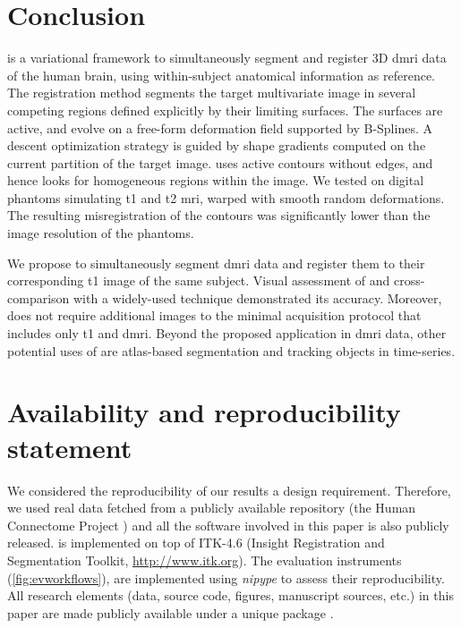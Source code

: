 \section*{Conclusion}
\label{sec:conclusion}

\Regseg{} is a variational framework to simultaneously segment and
  register 3D \gls*{dmri} data of the human brain, using within-subject
  anatomical information as reference.
The registration method segments the target multivariate image in several competing regions
  defined explicitly by their limiting surfaces.
The surfaces are active, and evolve on a free-form deformation field supported by B-Splines.
A descent optimization strategy is guided by shape gradients computed on the current partition
  of the target image.
\Regseg{} uses active contours without edges, and hence looks for
  homogeneous regions within the image.
We tested \regseg{} on digital phantoms simulating \gls*{t1} and \gls*{t2} \gls*{mri},
	warped with smooth random deformations.
The resulting misregistration of the contours was significantly lower than the image resolution
  of the phantoms.

We propose \regseg{} to simultaneously segment \gls*{dmri} data and register them to
  their corresponding \gls*{t1} image of the same subject.
Visual assessment of \regseg{} and cross-comparison with a widely-used technique demonstrated 
  its accuracy.
Moreover, \regseg{} does not require additional images to the minimal acquisition protocol
  that includes only \gls*{t1} and \gls*{dmri}.
Beyond the proposed application in \gls*{dmri} data, other potential uses of \regseg{} are
  atlas-based segmentation and tracking objects in time-series.


\section*{Availability and reproducibility statement}
\label{sec:availability}
We considered the reproducibility of our results a design requirement.
Therefore, we used real data fetched from a publicly available repository
  (the Human Connectome Project \citep{essen_human_2012}) and all the software
  involved in this paper is also publicly released.
\Regseg{} is implemented on top of ITK-4.6 (Insight Registration and 
  Segmentation Toolkit, \url{http://www.itk.org}).
The evaluation instruments (\autoref{fig:evworkflows}), are implemented using
  \emph{nipype} \citep{gorgolewski_nipype_2011} to assess their reproducibility.
All research elements (data, source code, figures, manuscript sources, etc.) in this paper
  are made publicly available under a unique package \citep{esteban_acweregistration_2015}.